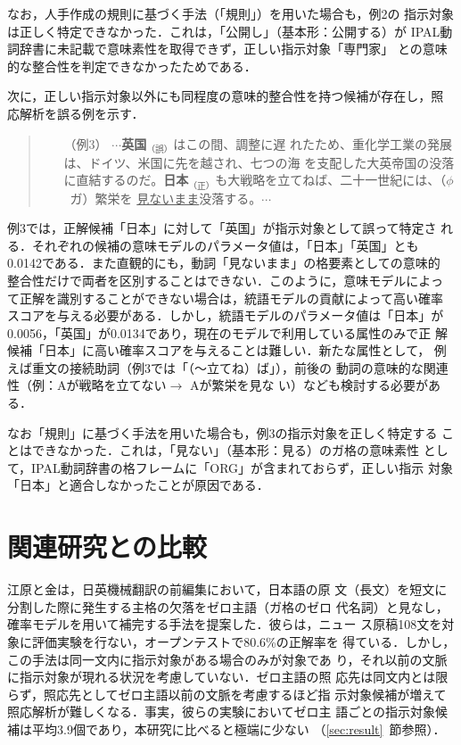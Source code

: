 なお，人手作成の規則に基づく手法（「規則」）を用いた場合も，例2の
指示対象は正しく特定できなかった．これは，「公開し」（基本形：公開する）が
IPAL動詞辞書に未記載で意味素性を取得できず，正しい指示対象「専門家」
との意味的な整合性を判定できなかったためである．

次に，正しい指示対象以外にも同程度の意味的整合性を持つ候補が存在し，照
応解析を誤る例を示す．

\begin{flushleft}
  \begin{quote}
    \begin{itemize}
    \item [（例3）]$\cdots${\bf 英国}$_{（誤）}$はこの間、調整に遅
      れたため、重化学工業の発展は、ドイツ、米国に先を越され、七つの海
      を支配した大英帝国の没落に直結するのだ。{\bf 日本}$_{（正）}
      $も大戦略を立てねば、二十一世紀には、（$\phi$~ガ）繁栄を
      \underline {見ないまま}没落する。$\cdots$
    \end{itemize}
  \end{quote}
\end{flushleft}

\noindent
例3では，正解候補「日本」に対して「英国」が指示対象として誤って特定さ
れる．それぞれの候補の意味モデルのパラメータ値は，「日本」「英国」とも
0.0142である．また直観的にも，動詞「見ないまま」の格要素としての意味的
整合性だけで両者を区別することはできない．このように，意味モデルによっ
て正解を識別することができない場合は，統語モデルの貢献によって高い確率
スコアを与える必要がある．しかし，統語モデルのパラメータ値は「日本」が
0.0056，「英国」が0.0134であり，現在のモデルで利用している属性のみで正
解候補「日本」に高い確率スコアを与えることは難しい．新たな属性として，
例えば重文の接続助詞（例3では「（〜立てね）ば」）\cite{naka96}，前後の
動詞の意味的な関連性（例：Aが戦略を立てない$\rightarrow$ Aが繁栄を見な
い）\cite{naka93}なども検討する必要がある．

なお「規則」に基づく手法を用いた場合も，例3の指示対象を正しく特定する
ことはできなかった．これは，「見ない」（基本形：見る）のガ格の意味素性
として，IPAL動詞辞書の格フレームに「ORG」が含まれておらず，正しい指示
対象「日本」と適合しなかったことが原因である．

\section{関連研究との比較}
\label{sec:hikaku}

江原と金\citeyear{ehar96}は，日英機械翻訳の前編集において，日本語の原
文（長文）を短文に分割した際に発生する主格の欠落をゼロ主語（ガ格のゼロ
代名詞）と見なし，確率モデルを用いて補完する手法を提案した．彼らは，ニュー
ス原稿108文を対象に評価実験を行ない，オープンテストで80.6\%の正解率を
得ている．しかし，この手法は同一文内に指示対象がある場合のみが対象であ
り，それ以前の文脈に指示対象が現れる状況を考慮していない．ゼロ主語の照
応先は同文内とは限らず，照応先としてゼロ主語以前の文脈を考慮するほど指
示対象候補が増えて照応解析が難しくなる．事実，彼らの実験においてゼロ主
語ごとの指示対象候補は平均3.9個であり，本研究に比べると極端に少ない
（\ref{sec:result}~節参照）．

